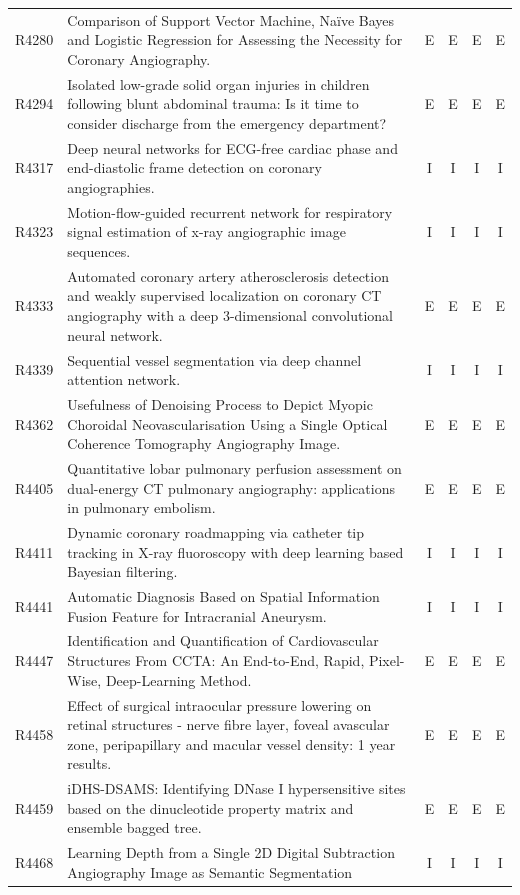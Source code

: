 \begin{longtable}{@{}l p{8.6cm} c c c c@{}}
R4280 & Comparison of Support Vector Machine, Naïve Bayes and Logistic Regression for Assessing the Necessity for Coronary Angiography. & E & E & E & E \\
R4294 & Isolated low-grade solid organ injuries in children following blunt abdominal trauma: Is it time to consider discharge from the emergency department? & E & E & E & E \\
R4317 & Deep neural networks for ECG-free cardiac phase and end-diastolic frame detection on coronary angiographies. & I & I & I & I \\
R4323 & Motion-flow-guided recurrent network for respiratory signal estimation of x-ray angiographic image sequences. & I & I & I & I \\
R4333 & Automated coronary artery atherosclerosis detection and weakly supervised localization on coronary CT angiography with a deep 3-dimensional convolutional neural network. & E & E & E & E \\
R4339 & Sequential vessel segmentation via deep channel attention network. & I & I & I & I \\
R4362 & Usefulness of Denoising Process to Depict Myopic Choroidal Neovascularisation Using a Single Optical Coherence Tomography Angiography Image. & E & E & E & E \\
R4405 & Quantitative lobar pulmonary perfusion assessment on dual-energy CT pulmonary angiography: applications in pulmonary embolism. & E & E & E & E \\
R4411 & Dynamic coronary roadmapping via catheter tip tracking in X-ray fluoroscopy with deep learning based Bayesian filtering. & I & I & I & I \\
R4441 & Automatic Diagnosis Based on Spatial Information Fusion Feature for Intracranial Aneurysm. & I & I & I & I \\
R4447 & Identification and Quantification of Cardiovascular Structures From CCTA: An End-to-End, Rapid, Pixel-Wise, Deep-Learning Method. & E & E & E & E \\
R4458 & Effect of surgical intraocular pressure lowering on retinal structures - nerve fibre layer, foveal avascular zone, peripapillary and macular vessel density: 1 year results. & E & E & E & E \\
R4459 & iDHS-DSAMS: Identifying DNase I hypersensitive sites based on the dinucleotide property matrix and ensemble bagged tree. & E & E & E & E \\
R4468 & Learning Depth from a Single 2D Digital Subtraction Angiography Image as Semantic Segmentation & I & I & I & I \\

\end{longtable}
